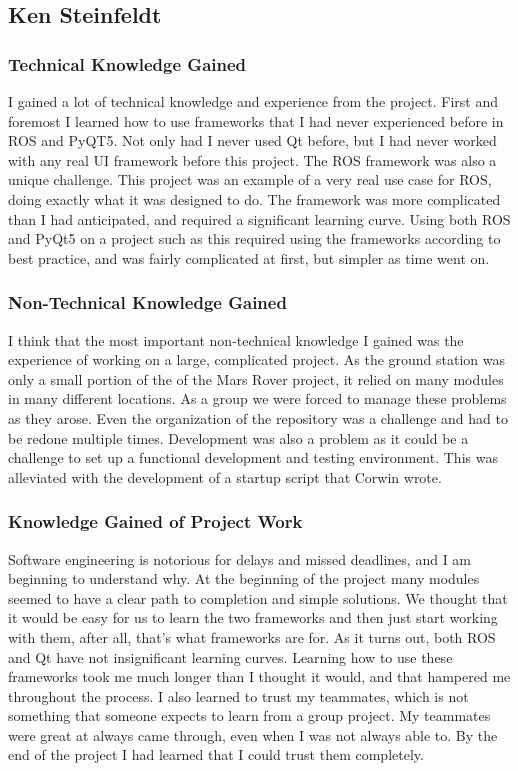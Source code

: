 \subsection{Ken Steinfeldt}
\subsubsection{Technical Knowledge Gained}
I gained a lot of technical knowledge and experience from the project.
First and foremost I learned how to use frameworks that I had never experienced before in ROS and PyQT5.
Not only had I never used Qt before, but I had never worked with any real UI framework before this project.
The ROS framework was also a unique challenge.
This project was an example of a very real use case for ROS, doing exactly what it was designed to do. 
The framework was more complicated than I had anticipated, and required a significant learning curve. 
Using both ROS and PyQt5 on a project such as this required using the frameworks according to best practice, and was fairly complicated at first, but simpler as time went on.
\subsubsection{Non-Technical Knowledge Gained}
I think that the most important non-technical knowledge I gained was the experience of working on a large, complicated project. 
As the ground station was only a small portion of the of the Mars Rover project, it relied on many modules in many different locations.
As a group we were forced to manage these problems as they arose. 
Even the organization of the repository was a challenge and had to be redone multiple times.
Development was also a problem as it could be a challenge to set up a functional development and testing environment. 
This was alleviated with the development of a startup script that Corwin wrote. 
\subsubsection{Knowledge Gained of Project Work}
Software engineering is notorious for delays and missed deadlines, and I am beginning to understand why.
At the beginning of the project many modules seemed to have a clear path to completion and simple solutions.
We thought that it would be easy for us to learn the two frameworks and then just start working with them, after all, that's what frameworks are for. 
As it turns out, both ROS and Qt have not insignificant learning curves. 
Learning how to use these frameworks took me much longer than I thought it would, and that hampered me throughout the process.
I also learned to trust my teammates, which is not something that someone expects to learn from a group project. 
My teammates were great at always came through, even when I was not always able to. 
By the end of the project I had learned that I could trust them completely.
